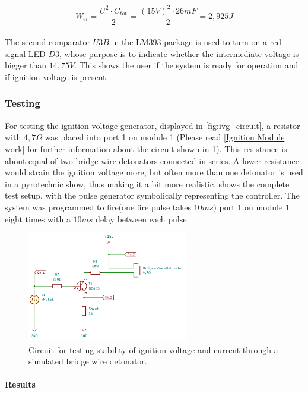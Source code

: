 \begin{equation}
W_{el}=\frac{U^2 \cdot C_{tot}}{2}=\frac{(15V)^2 \cdot 26mF}{2}=2,925J
\label{eq:power_in_system}
\end{equation}\\

\noindent The second comparator $U3B$ in the LM393 package is used to turn on a red signal LED $D3$, whose purpose is to indicate whether the intermediate voltage is bigger than $14,75V$. This shows the user if the system is ready for operation and if ignition voltage is present.\\


\pagebreak

\subsubsection{Testing}
\label{Testing}
For testing the ignition voltage generator, displayed in \cref{fig:ivg_circuit}, a resistor with $4,7\Omega$ was placed into port 1 on module 1 (Please read \cref{Ignition Module work} for further information about the circuit shown in \cref{fig:testrig_pulse}). This resistance is about equal of two bridge wire detonators connected in series. A lower resistance would strain the ignition voltage more, but often more than one detonator is used in a pyrotechnic show, thus making it a bit more realistic.  shows the complete test setup, with the pulse generator symbolically representing the controller. The system was programmed to fire(one fire pulse takes $10ms$) port 1 on module 1 eight times with a $10ms$ delay between each pulse.

\begin{figure}[!ht]
    \centering
    \includegraphics[width=7cm]{./Figures/testrig_pulse.png}
    \caption{Circuit for testing stability of ignition voltage and current through a simulated bridge wire detonator.}
    \label{fig:testrig_pulse}     
\end{figure}

\paragraph{Results}
\label{Results}

